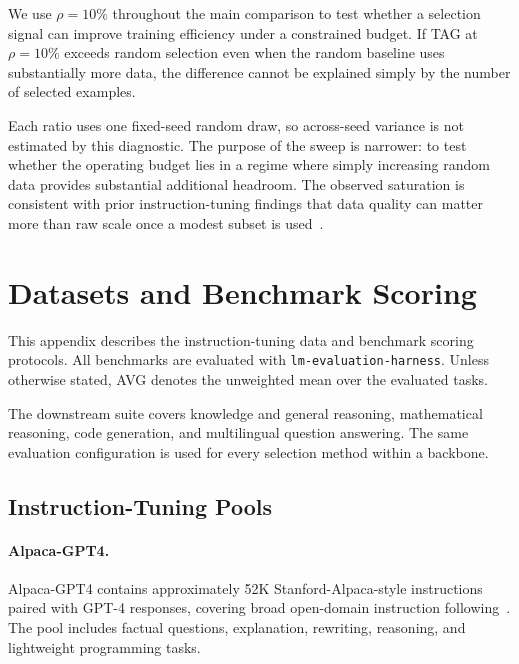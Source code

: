 We use \(\rho=10\%\) throughout the main comparison to test whether a
selection signal can improve training efficiency under a constrained
budget. If TAG at \(\rho=10\%\) exceeds random selection even when the
random baseline uses substantially more data, the difference cannot be
explained simply by the number of selected examples.

Each ratio uses one fixed-seed random draw, so across-seed variance is
not estimated by this diagnostic. The purpose of the sweep is narrower:
to test whether the operating budget lies in a regime where simply
increasing random data provides substantial additional headroom. The
observed saturation is consistent with prior instruction-tuning
findings that data quality can matter more than raw scale once a modest
subset is used~\cite{zhou2023lima}.



\section{Datasets and Benchmark Scoring}
\label{app:benchmarks}

This appendix describes the instruction-tuning data and benchmark
scoring protocols. All benchmarks are evaluated with
\texttt{lm\allowbreak-evaluation\allowbreak-harness}. Unless otherwise
stated, AVG denotes the unweighted mean over the evaluated tasks.

The downstream suite covers knowledge and general reasoning,
mathematical reasoning, code generation, and multilingual question
answering. The same evaluation configuration is used for every
selection method within a backbone.


\subsection{Instruction-Tuning Pools}
\label{app:instruction-pools}

\paragraph{Alpaca-GPT4.}
Alpaca-GPT4 contains approximately 52K Stanford-Alpaca-style
instructions paired with GPT-4 responses, covering broad open-domain
instruction following~\cite{wang2023selfinstruct}. The pool includes
factual questions, explanation, rewriting, reasoning, and lightweight
programming tasks.

